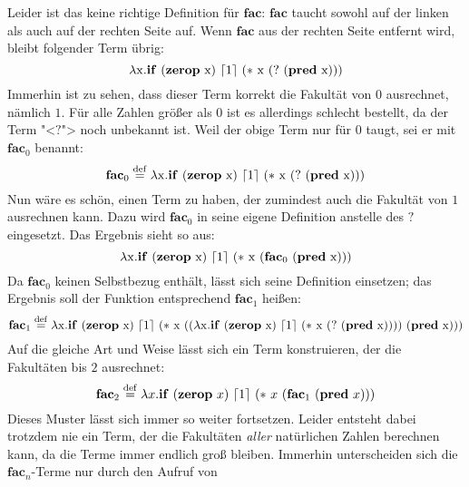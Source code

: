 Leider ist das keine richtige Definition für $\mathbf{fac}$:
$\mathbf{fac}$ taucht sowohl auf der linken
als auch auf der rechten Seite auf.  Wenn $\mathbf{fac}$ aus der
rechten Seite entfernt wird, bleibt folgender Term übrig:
%
\begin{displaymath}
  \lambda \mathrm x.\mathbf{if}~(\mathbf{zerop}~\mathrm x)~\lceil 1\rceil~(\ast~\mathrm x~(?~(\mathbf{pred}~\mathrm x)))
\end{displaymath}
%
Immerhin ist zu sehen, dass dieser Term korrekt die Fakultät von $0$
ausrechnet, nämlich $1$.  Für alle Zahlen größer als $0$ ist es allerdings
schlecht bestellt, da der Term "<$?$"> noch unbekannt ist.
Weil der obige Term nur für $0$ taugt, sei er mit $\mathbf{fac}_0$
benannt:
%
\begin{displaymath}
  \mathbf{fac}_0 \stackrel{\rm def}{=} \lambda \mathrm x.\mathbf{if}~(\mathbf{zerop}~\mathrm
  x)~\lceil 1\rceil~(\ast~\mathrm x~(?~(\mathbf{pred}~\mathrm x)))
\end{displaymath}
%
Nun wäre es schön, einen Term zu haben, der zumindest auch die
Fakultät von $1$ ausrechnen kann.  Dazu wird $\mathbf{fac}_0$ in
seine eigene Definition anstelle des $?$ eingesetzt.  Das Ergebnis
sieht so aus:
%
\begin{displaymath}
  \lambda \mathrm x.\mathbf{if}~(\mathbf{zerop}~\mathrm x)~\lceil 1\rceil~(\ast~\mathrm x~(\mathbf{fac}_0~(\mathbf{pred}~\mathrm x)))
\end{displaymath}
%
Da $\mathbf{fac}_0$ keinen Selbstbezug enthält, lässt sich seine
Definition einsetzen; das Ergebnis soll der Funktion entsprechend
$\mathbf{fac}_1$ heißen:
%
\begin{displaymath}
  \mathbf{fac}_1 \stackrel{\rm def}{=}{} \lambda \mathrm
  x.\mathbf{if}~(\mathbf{zerop}~\mathrm x)~\lceil 1\rceil~(\ast~\mathrm
  x~((\lambda \mathrm x.\mathbf{if}~(\mathbf{zerop}~\mathrm x)~\lceil 1\rceil~(\ast~\mathrm x~(?~(\mathbf{pred}~\mathrm x))))~(\mathbf{pred}~\mathrm x)))
\end{displaymath}
%
Auf die gleiche Art und Weise lässt sich ein Term konstruieren, der
die Fakultäten bis $2$ ausrechnet:
%
\begin{displaymath}
  \mathbf{fac}_2 \stackrel{\rm def}{=}{} \lambda
  x.\mathbf{if}~(\mathbf{zerop}~x)~\lceil 1\rceil~(\ast~x~(\mathbf{fac}_1~(\mathbf{pred}~x)))
\end{displaymath}
%
Dieses Muster lässt sich immer so weiter fortsetzen.  Leider entsteht
dabei trotzdem nie ein Term, der die Fakultäten \emph{aller}
natürlichen Zahlen berechnen kann, da die Terme immer endlich groß
bleiben.
Immerhin unterscheiden sich die $\mathbf{fac}_n$-Terme 
nur durch den Aufruf von
